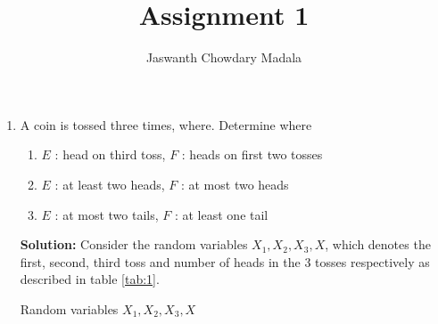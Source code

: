 \documentclass[journal,12pt,twocolumn]{IEEEtran}
\begin{document}
\vspace{3cm}


\title{Assignment 1}
\author{Jaswanth Chowdary Madala}





\maketitle

\newpage


\bigskip

\renewcommand{\thefigure}{\theenumi}
\renewcommand{\thetable}{\theenumi}



\begin{enumerate}
\item A coin is tossed three times, where. Determine  where
\begin{enumerate}
\item $E$ : head on third toss, $F$ : heads on first two tosses
\item $E$ : at least two heads, $F$ : at most two heads
\item $E$ : at most two tails, $F$ : at least one tail
\end{enumerate}
\textbf{Solution:} Consider the random variables $X_1, X_2, X_3,X$, which denotes the first, second, third toss and number of heads in the 3 tosses respectively as described in table \ref{tab:1}.
\begin{table}[h]
\centering

\caption{Random variables $X_1, X_2, X_3, X$}
\label{tab:1}
\end{table}


\end{enumerate}
\end{document}
